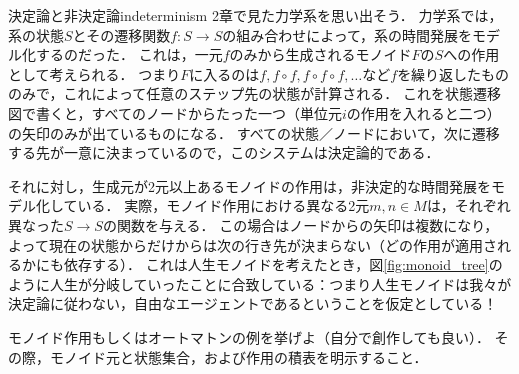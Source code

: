 \documentclass[11pt,a4paper, dvipdfmx]{jsarticle}
\begin{document}
\begin{rei}{決定論と非決定論}{indeterminism}
    2章で見た力学系を思い出そう．
    力学系では，系の状態$S$とその遷移関数$f:S \to S$の組み合わせによって，系の時間発展をモデル化するのだった．
    これは，一元$f$のみから生成されるモノイド$F$の$S$への作用として考えられる．
    つまり$F$に入るのは$f, f \circ f, f \circ f \circ f, \dots$など$f$を繰り返したもののみで，これによって任意のステップ先の状態が計算される．
    これを状態遷移図で書くと，すべてのノードからたった一つ（単位元$i$の作用を入れると二つ）の矢印のみが出ているものになる．
    すべての状態／ノードにおいて，次に遷移する先が一意に決まっているので，このシステムは決定論的である．
    
    それに対し，生成元が2元以上あるモノイドの作用は，非決定的な時間発展をモデル化している．
    実際，モノイド作用における異なる2元$m, n \in M$は，それぞれ異なった$S \to S$の関数を与える．
    この場合はノードからの矢印は複数になり，よって現在の状態からだけからは次の行き先が決まらない（どの作用が適用されるかにも依存する）．
    これは人生モノイドを考えたとき，図\ref{fig:monoid_tree}のように人生が分岐していったことに合致している：つまり人生モノイドは我々が決定論に従わない，自由なエージェントであるということを仮定としている！
\end{rei}


\begin{renshu}{}{}
    モノイド作用もしくはオートマトンの例を挙げよ（自分で創作しても良い）．
    その際，モノイド元と状態集合，および作用の積表を明示すること．
\end{renshu}
    







\end{document}
